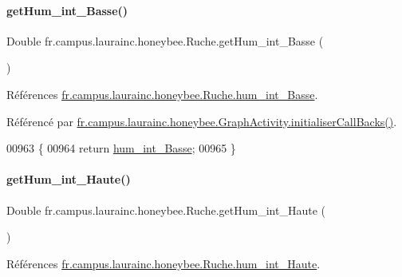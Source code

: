 \paragraph{\texorpdfstring{get\+Hum\+\_\+int\+\_\+\+Basse()}{getHum\_int\_Basse()}}
{\footnotesize\ttfamily Double fr.\+campus.\+laurainc.\+honeybee.\+Ruche.\+get\+Hum\+\_\+int\+\_\+\+Basse (\begin{DoxyParamCaption}{ }\end{DoxyParamCaption})}



Références \hyperlink{classfr_1_1campus_1_1laurainc_1_1honeybee_1_1_ruche_a5d7949f1f6daa28454a0a5468faab337}{fr.\+campus.\+laurainc.\+honeybee.\+Ruche.\+hum\+\_\+int\+\_\+\+Basse}.



Référencé par \hyperlink{classfr_1_1campus_1_1laurainc_1_1honeybee_1_1_graph_activity_a8dc56c3e0744bcb9295ad10e726b5fdb}{fr.\+campus.\+laurainc.\+honeybee.\+Graph\+Activity.\+initialiser\+Call\+Backs()}.


\begin{DoxyCode}
00963                                      \{
00964         \textcolor{keywordflow}{return} \hyperlink{classfr_1_1campus_1_1laurainc_1_1honeybee_1_1_ruche_a5d7949f1f6daa28454a0a5468faab337}{hum\_int\_Basse};
00965     \}
\end{DoxyCode}
\mbox{\label{classfr_1_1campus_1_1laurainc_1_1honeybee_1_1_ruche_a7b4dfda126b3cb0c370e89ac8a646a9d}} 
\paragraph{\texorpdfstring{get\+Hum\+\_\+int\+\_\+\+Haute()}{getHum\_int\_Haute()}}
{\footnotesize\ttfamily Double fr.\+campus.\+laurainc.\+honeybee.\+Ruche.\+get\+Hum\+\_\+int\+\_\+\+Haute (\begin{DoxyParamCaption}{ }\end{DoxyParamCaption})}



Références \hyperlink{classfr_1_1campus_1_1laurainc_1_1honeybee_1_1_ruche_ac6b4da59e8ad8537926cc4ca7a6d4746}{fr.\+campus.\+laurainc.\+honeybee.\+Ruche.\+hum\+\_\+int\+\_\+\+Haute}.



